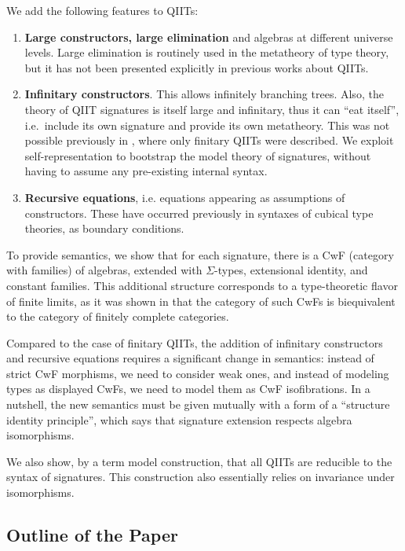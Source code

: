 \documentclass[sigplan,review,anonymous]{acmart}\settopmatter{printfolios=true,printccs=false,printacmref=false}
\begin{document}
We add the following features to QIITs:
\begin{enumerate}
  \item
  \textbf{Large constructors, large elimination} and algebras at different
  universe levels. Large elimination is routinely used in the metatheory of type
  theory, but it has not been presented explicitly in previous works about
  QIITs.
  \item
  \textbf{Infinitary constructors}. This allows infinitely branching
  trees. Also, the theory of QIIT signatures is itself large and infinitary,
  thus it can ``eat itself'', i.e.\ include its own signature and provide
  its own metatheory. This was not possible previously in
  \cite{kaposi2019constructing}, where only finitary QIITs were described. We
  exploit self-representation to bootstrap the model theory of signatures,
  without having to assume any pre-existing internal syntax.
  \item
  \textbf{Recursive equations}, i.e. equations appearing as assumptions
  of constructors. These have occurred previously in syntaxes of cubical type
  theories, as boundary conditions\cite{TODO}.
\end{enumerate}

To provide semantics, we show that for each signature, there is a CwF (category
with families) of algebras, extended with $\Sigma$-types, extensional identity,
and constant families. This additional structure corresponds to a type-theoretic
flavor of finite limits, as it was shown in \cite{clairambault2014biequivalence}
that the category of such CwFs is biequivalent to the category of finitely
complete categories.

Compared to the case of finitary QIITs, the addition of infinitary constructors
and recursive equations requires a significant change in semantics: instead of
strict CwF morphisms, we need to consider weak ones, and instead of modeling
types as displayed CwFs, we need to model them as CwF isofibrations. In a
nutshell, the new semantics must be given mutually with a form of a ``structure
identity principle''\cite{TODO}, which says that signature extension respects algebra
isomorphisms.

We also show, by a term model construction, that all QIITs are reducible to the
syntax of signatures. This construction also essentially relies on invariance under
isomorphisms.

\subsection{Outline of the Paper}
\end{document}
